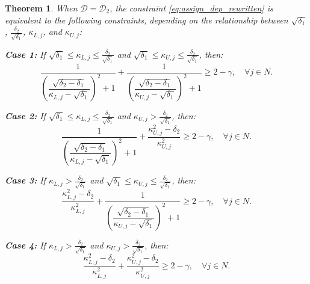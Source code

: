 \documentclass[preprint,12pt,authoryear]{elsarticle}
\newtheorem{theorem}{Theorem}
\begin{document}
\begin{theorem}\label{thm:assign_dep_d2}
When $\mathcal{D} = \mathcal{D}_2$, the constraint \eqref{eq:assign_dep_rewritten} is equivalent to the following constraints, depending on the relationship between $\sqrt{\delta_1}$, $\frac{\delta_2}{\sqrt{\delta_1}}$, $\kappa_{L,j}$, and $\kappa_{U,j}$:

\textbf{Case 1:} If $\sqrt{\delta_1} \leqslant \kappa_{L,j} \leqslant \frac{\delta_2}{\sqrt{\delta_1}}$ and $\sqrt{\delta_1} \leqslant \kappa_{U,j} \leqslant \frac{\delta_2}{\sqrt{\delta_1}}$, then:
\begin{equation}
\dfrac{1}{\left( \dfrac{\sqrt{\delta_2 - \delta_1}}{\kappa_{L,j} - \sqrt{\delta_1}} \right)^{2} + 1} + \dfrac{1}{\left( \dfrac{\sqrt{\delta_2 - \delta_1}}{\kappa_{U,j} - \sqrt{\delta_1}} \right)^{2} + 1} \geqslant 2 - \gamma, \quad \forall j \in N. \label{eq:assign_dep_d2_exact_case1}
\end{equation}

\textbf{Case 2:} If $\sqrt{\delta_1} \leqslant \kappa_{L,j} \leqslant \frac{\delta_2}{\sqrt{\delta_1}}$ and $\kappa_{U,j} > \frac{\delta_2}{\sqrt{\delta_1}}$, then:
\begin{equation}
\dfrac{1}{\left( \dfrac{\sqrt{\delta_2 - \delta_1}}{\kappa_{L,j} - \sqrt{\delta_1}} \right)^{2} + 1} + \dfrac{\kappa_{U,j}^{2} - \delta_2}{\kappa_{U,j}^{2}} \geqslant 2 - \gamma, \quad \forall j \in N. \label{eq:assign_dep_d2_exact_case2}
\end{equation}

\textbf{Case 3:} If $\kappa_{L,j} > \frac{\delta_2}{\sqrt{\delta_1}}$ and $\sqrt{\delta_1} \leqslant \kappa_{U,j} \leqslant \frac{\delta_2}{\sqrt{\delta_1}}$, then:
\begin{equation}
\dfrac{\kappa_{L,j}^{2} - \delta_2}{\kappa_{L,j}^{2}} + \dfrac{1}{\left( \dfrac{\sqrt{\delta_2 - \delta_1}}{\kappa_{U,j} - \sqrt{\delta_1}} \right)^{2} + 1} \geqslant 2 - \gamma, \quad \forall j \in N. \label{eq:assign_dep_d2_exact_case3}
\end{equation}

\textbf{Case 4:} If $\kappa_{L,j} > \frac{\delta_2}{\sqrt{\delta_1}}$ and $\kappa_{U,j} > \frac{\delta_2}{\sqrt{\delta_1}}$, then:
\begin{equation}
\dfrac{\kappa_{L,j}^{2} - \delta_2}{\kappa_{L,j}^{2}} + \dfrac{\kappa_{U,j}^{2} - \delta_2}{\kappa_{U,j}^{2}} \geqslant 2 - \gamma, \quad \forall j \in N. \label{eq:assign_dep_d2_exact_case4}
\end{equation}
\end{theorem}
\end{document}
